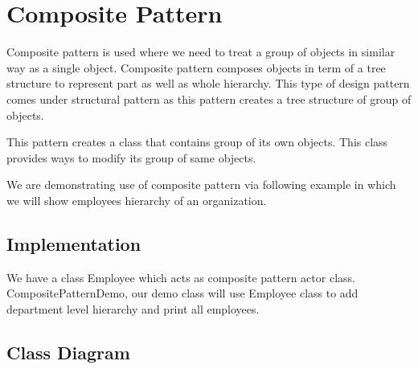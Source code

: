 \newpage
\section{Composite Pattern}

Composite pattern is used where we need to treat a group of objects in similar way as a single object. Composite pattern composes objects in term of a tree structure to represent part as well as whole hierarchy. This type of design pattern comes under structural pattern as this pattern creates a tree structure of group of objects.

This pattern creates a class that contains group of its own objects. This class provides ways to modify its group of same objects.

We are demonstrating use of composite pattern via following example in which we will show employees hierarchy of an organization.

\subsection{Implementation}

We have a class Employee which acts as composite pattern actor class. CompositePatternDemo, our demo class will use Employee class to add department level hierarchy and print all employees.

\subsection{Class Diagram}

